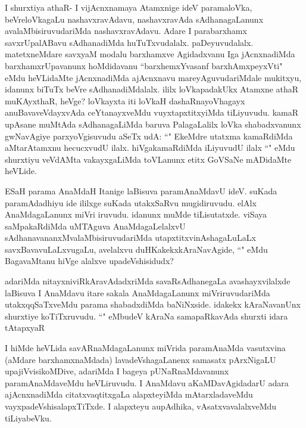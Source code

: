 \begin{artha}
I shurxtiya athaR- I vijAcnxnamaya Atamxnige ideV paramaloVka, beVreloVkagaLu nashavxravAdavu, nashavxravAda sAdhanagaLanunx avalaMbisiruvudariMda nashavxravAdavu. Adare I parabarxhamx savxrUpalABavu sAdhanadiMda huTuTxvudalalx. paDeyuvudalalx. matetxneMdare savxyaM modalu barxhamxve Agidadxvanu Iga jAcnxnadiMda barxhamxrUpavanunx hoMdidavanu ``barxhemxYvasanf barxhAmxpeyxVti" eMdu heVLidaMte jAcnxnadiMda ajAcnxnavu mareyAguvudariMdale mukitxyu, idanunx biTuTx beVre sAdhanadiMdalalx. ililx loVkapadakUkx Atamxne athaR muKAyxthaR, heVge? loVkayxta iti loVkaH dashaRnayoVhagayx anuBavaveVdayxvAda ceYtanayxveMdu vuyxtapxtitxyiMda tiLiyuvudu. kamaR upAsane muMtAda sAdhanagaLiMda baruva PalagaLalilx loVka shabadxvanunx gwNavAgiye parxyoVgisuvudu aSeTx udA: ``\stext " EkeMdre utatxma kamaRdiMda aMtarAtamxnu hecucxvudU ilalx. hiVgakamaRdiMda iLiyuvudU ilalx ``\stext " eMdu shurxtiyu veVdAMta vakayxgaLiMda toVLanunx etitx GoVSaNe mADidaMte heVLide. 
\end{artha}%

\begin{artha}
ESaH parama AnaMdaH Itanige laBisuva paramAnaMdavU ideV. suKada paramAdadhiyu ide ililxge suKada utakxSaRvu mugidiruvudu. elAlx AnaMdagaLanunx miVri iruvudu. idanunx muMde tiLisutatxde. viSaya saMpakaRdiMda uMTAguva AnaMdagaLelalxvU sAdhanavananxMvalaMbisiruvudariMda utapxtitxvinAshagaLuLaLx savxBavavuLaLxvugaLu, avelalxvu duHKakekxkAraNavAgide, ``\stext " eMdu BagavaMtanu hiVge alalxve upadeVshisidudx? 
\end{artha}

\begin{artha}
adariMda nitayxniviRkAravAdadxriMda savaRsAdhanegaLa avashayxvilalxde laBisuva I AnaMdavu itare sakala AnaMdagaLanunx miVriruvudariMda utakxqqSaTxveMdu parama shabadxdiMda baNiNxside. idakekx kAraNavanUnx shurxtiye koTiTxruvudu. ``\stext " eMbudeV kAraNa samapaRkavAda shurxti idara tAtapxyaR 
\end{artha}

\begin{artha}
I hiMde heVLida savARnaMdagaLanunx miVrida paramAnaMda vasutxvina (aMdare barxhamxnaMdada) lavadeVshagaLanenx samasatx pArxNigaLU upajiVvisikoMDive, adariMda I bageya pUNaRnaMdavanunx paramAnaMdaveMdu heVLiruvudu. I AnaMdavu aKaMDavAgidadarU adara ajAcnxnadiMda citatxvaqtitxgaLa alapxteyiMda mAtarxladaveMdu vayxpadeVshisalapxTiTxde. I alapxteyu aupAdhika, vAsatxvavalalxveMdu tiLiyabeVku.   
\end{artha}

